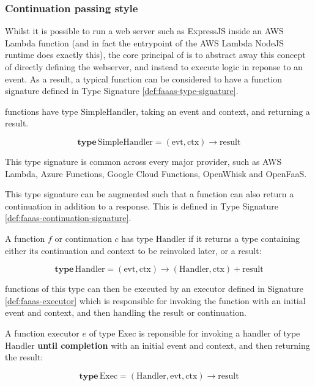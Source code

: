 \subsubsection{Continuation passing style}
Whilst it is possible to run a web server such as ExpressJS inside an AWS Lambda function (and in fact the entrypoint of the AWS Lambda NodeJS runtime does exactly this), the core principal of \faas{} is to abstract away this concept of directly defining the webserver, and instead to execute logic in reponse to an event. As a result, a typical \faas{} function can be considered to have a function signature defined in Type Signature \ref{def:faaas-type-signature}.

\begin{signature}
\label{def:faaas-type-signature}
\faas{} functions have type $\textrm{SimpleHandler}$, taking an event and context, and returning a result.

$$\textbf{type}\, \textrm{SimpleHandler} = (\textrm{evt}, \textrm{ctx}) \rightarrow \textrm{result}$$
\end{signature}

This type signature is common across every major \faas{} provider, such as AWS Lambda\cite{amazonAWSLambda2024}, Azure Functions\cite{azureAzureFunctions2024}, Google Cloud Functions\cite{googleGoogleCloudFunctions2024}, OpenWhisk\cite{apacheOpenWhisk2024} and OpenFaaS\cite{ellisOpenFaaS2024}.

This type signature can be augmented such that a function can also return a continuation in addition to a response. This is defined in Type Signature \ref{def:faaas-continuation-signature}.

\begin{signature}
\label{def:faaas-continuation-signature}
A function $f$ or continuation $c$ has type $\textrm{Handler}$ if it returns a type containing either its continuation and context to be reinvoked later, or a result:

$$\textbf{type}\, \textrm{Handler} = (\textrm{evt}, \textrm{ctx}) \rightarrow (\textrm{Handler}, \textrm{ctx}) + \textrm{result}$$
\end{signature}

\faas{} functions of this type can then be executed by an executor defined in Signature \ref{def:faaas-executor} which is responsible for invoking the function with an initial event and context, and then handling the result or continuation.

\begin{signature}
\label{def:faaas-executor}
A function executor $e$ of type $\textrm{Exec}$ is reponsible for invoking a \faaas{} handler of type $\textrm{Handler}$ \textbf{until completion} with an initial event and context, and then returning the result:

$$\textbf{type}\, \textrm{Exec} = (\textrm{Handler}, \textrm{evt}, \textrm{ctx}) \rightarrow \textrm{result}$$
\end{signature}

